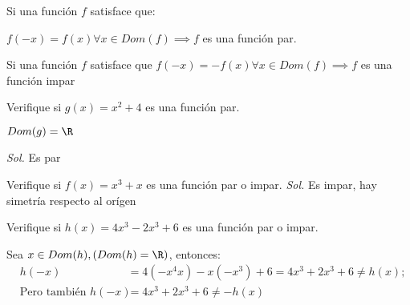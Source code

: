 \begin{definition}
	Si una función $f$ satisface que:

	$f(-x)=f(x) \forall x\in Dom (f) \implies f$ es una función par.
\end{definition}


\begin{definition}
	Si una función $f$ satisface que $f(-x)=-f(x) \forall x\in Dom (f) \implies f$ es una función impar
\end{definition}

\begin{example}
	Verifique si $g(x)=x^2 +4$ es una función par.

	$Dom(g)=\R$

	\textit{ Sol. } Es par
\end{example}

\begin{example}
	Verifique si $f(x)=x^3+x$ es una función par o impar.
	\textit{ Sol. } Es impar, hay simetría respecto al orígen
\end{example}

\begin{example}
	Verifique si $h(x)=4x^3-2x^3+6$ es una función par o impar.

	Sea $x\in Dom(h), \left(Dom(h)=\R \right)$, entonces:
	\begin{align*}
		 & h(-x)                      & =4\left(-x^4x\right)-x\left(-x^3\right)+6=4x^3+2x^3+6\neq h(x); \\
		 & \text{Pero también } h(-x) & =4x^3+2x^3+6\neq -h(x)
	\end{align*}
\end{example}

